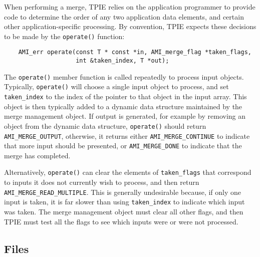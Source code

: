     When performing a merge, TPIE relies on the application
    programmer to provide code to determine the order of any
    two application data elements, and certain other
    application-specific processing. By convention, TPIE
    expects these decisions to be made by the
    \lstinline|operate()| function:
\begin{lstlisting}
    AMI_err operate(const T * const *in, AMI_merge_flag *taken_flags,
                    int &taken_index, T *out);
\end{lstlisting}
    The \lstinline|operate()| member function is called
    repeatedly to process input objects.  Typically,
    \lstinline|operate()| will choose a single input object to
    process, and set \lstinline|taken_index| to the index of
    the pointer to that object in the input array.  This
    object is then typically added to a dynamic data
    structure maintained by the merge management object.  If
    output is generated, for example by removing an object
    from the dynamic data structure, \lstinline|operate()|
    should return \lstinline|AMI_MERGE_OUTPUT|, otherwise, it
    returns either \lstinline|AMI_MERGE_CONTINUE| to indicate
    that more input should be presented, or
    \lstinline|AMI_MERGE_DONE| to indicate that the merge has
    completed.
    
    Alternatively, \lstinline|operate()| can clear the elements
    of \lstinline|taken_flags| that correspond to inputs it
    does not currently wish to process, and then return
    \lstinline|AMI_MERGE_READ_MULTIPLE|.  This is generally
    undesirable because, if only one input is taken, it is
    far slower than using \lstinline|taken_index| to indicate
    which input was taken.  The merge management object must
    clear all other flags, and then TPIE must test all the
    flags to see which inputs were or were not processed.





\subsection{Files}
  \btabb
     {}
  \etabb

